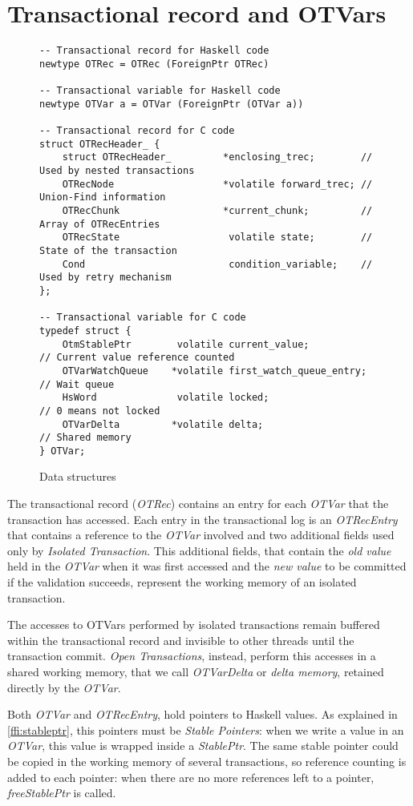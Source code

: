 \section{Transactional record and OTVars}
\begin{figure}
\begin{Verbatim}
-- Transactional record for Haskell code
newtype OTRec = OTRec (ForeignPtr OTRec)

-- Transactional variable for Haskell code
newtype OTVar a = OTVar (ForeignPtr (OTVar a))

-- Transactional record for C code
struct OTRecHeader_ {
    struct OTRecHeader_         *enclosing_trec;        // Used by nested transactions
    OTRecNode                   *volatile forward_trec; // Union-Find information
    OTRecChunk                  *current_chunk;         // Array of OTRecEntries
    OTRecState                   volatile state;        // State of the transaction
    Cond                         condition_variable;    // Used by retry mechanism
};

-- Transactional variable for C code
typedef struct {
    OtmStablePtr        volatile current_value;            // Current value reference counted
    OTVarWatchQueue    *volatile first_watch_queue_entry;  // Wait queue
    HsWord              volatile locked;                   // 0 means not locked
    OTVarDelta         *volatile delta;                    // Shared memory
} OTVar;
\end{Verbatim}
\caption{Data structures}
\end{figure}
The transactional record (\emph{OTRec}) contains an entry for each \emph{OTVar} that the transaction has accessed.
Each entry in the transactional log is an \emph{OTRecEntry} that contains a reference to the \emph{OTVar} involved and two additional fields used only by \emph{Isolated Transaction}.
This additional fields, that contain the \emph{old value} held in the \emph{OTVar} when it was first accessed and the \emph{new value} to be committed if the validation succeeds, represent the working memory of an isolated transaction.

The accesses to OTVars performed by isolated transactions remain buffered within the transactional record and invisible to other threads until the transaction commit. \emph{Open Transactions}, instead, perform this accesses in a shared working memory, that we call \emph{OTVarDelta} or \emph{delta memory}, retained directly by the \emph{OTVar}.

Both \emph{OTVar} and \emph{OTRecEntry}, hold pointers to Haskell values. 
As explained in \cref{ffi:stableptr}, this pointers must be \emph{Stable Pointers}: when we write a value in an \emph{OTVar}, this value is wrapped inside a \emph{StablePtr}.
The same stable pointer could be copied in the working memory of several transactions, so reference counting is added to each pointer: when there are no more references left to a pointer, \emph{freeStablePtr} is called.

